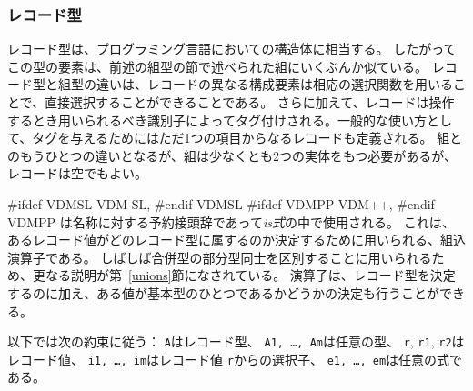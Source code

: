 \documentclass[\pformat,12pt]{jarticle}
\newcommand{\vdmslpp}[2]{%
#ifdef VDMSL
#1
#endif VDMSL
#ifdef VDMPP
#2
#endif VDMPP
}
\newcommand{\vdmsl}{VDM-SL}
\newcommand{\vdmpp}{VDM++}
\begin{document}
\subsubsection{レコード型}\label{records}

レコード型は、プログラミング言語においての構造体に相当する。
したがってこの型の要素は、前述の組型の節で述べられた組にいくぶんか似ている。
レコード型と組型の違いは、レコードの異なる構成要素は相応の選択関数を用いることで、直接選択することができることである。 
さらに加えて、レコードは操作するとき用いられるべき識別子によってタグ付けされる。一般的な使い方として、タグを与えるためにはただ1つの項目からなるレコードも定義される。
組とのもうひとつの違いとなるが、組は少なくとも2つの実体をもつ必要があるが、レコードは空でもよい。

\vdmslpp{\vdmsl,}{\vdmpp,}  は名称に対する予約接頭辞であって{\it is式}の中で使用される。 
これは、あるレコード値がどのレコード型に属するのか決定するために用いられる、組込演算子である。
しばしば合併型の部分型同士を区別することに用いられるため、更なる説明が第~\ref{unions}節になされている。 
演算子は、レコード型を決定するのに加え、ある値が基本型のひとつであるかどうかの決定も行うことができる。
 
以下では次の約束に従う： {\tt A}はレコード型、 {\tt A1, \ldots, Am}は任意の型、 {\tt r}, {\tt r1}, {\tt r2}はレコード値、 {\tt i1, \ldots, im}はレコード値 {\tt r}からの選択子、 {\tt e1, \ldots, em}は任意の式である。
\end{document}
